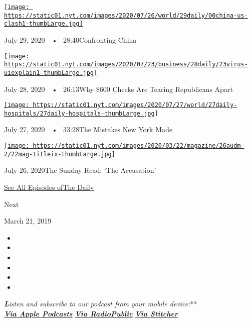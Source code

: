\href{https://www.nytimes.com/2020/07/29/podcasts/the-daily/china-trump-foreign-policy.html?action=click\&module=audio-series-bar\&region=header\&pgtype=Article}{\texttt{[image: https://static01.nyt.com/images/2020/07/26/world/29daily/00china-us-clash1-thumbLarge.jpg]}}

July 29, 2020~~•~ 28:40Confronting China

\href{https://www.nytimes.com/2020/07/28/podcasts/the-daily/unemployment-benefits-coronavirus.html?action=click\&module=audio-series-bar\&region=header\&pgtype=Article}{\texttt{[image: https://static01.nyt.com/images/2020/07/23/business/28daily/23virus-uiexplain1-thumbLarge.jpg]}}

July 28, 2020~~•~ 26:13Why \$600 Checks Are Tearing Republicans Apart

\href{https://www.nytimes.com/2020/07/27/podcasts/the-daily/new-york-hospitals-covid.html?action=click\&module=audio-series-bar\&region=header\&pgtype=Article}{\texttt{[image: https://static01.nyt.com/images/2020/07/27/world/27daily-hospitals/27daily-hospitals-thumbLarge.jpg]}}

July 27, 2020~~•~ 33:28The Mistakes New York Made

\href{https://www.nytimes.com/2020/07/26/podcasts/the-daily/the-accusation-the-sunday-read.html?action=click\&module=audio-series-bar\&region=header\&pgtype=Article}{\texttt{[image: https://static01.nyt.com/images/2020/03/22/magazine/26audm-2/22mag-titleix-thumbLarge.jpg]}}

July 26, 2020The Sunday Read: `The Accusation'

\href{https://www.nytimes.com/column/the-daily}{See All Episodes ofThe
Daily}

Next

March 21, 2019

\begin{itemize}
\item
\item
\item
\item
\item
\item
\end{itemize}

\emph{\textbf{L}isten and subscribe to our podcast from your mobile
device:}**\\
\textbf{\href{https://itunes.apple.com/us/podcast/the-daily/id1200361736?mt=2}{\emph{Via
Apple Podcasts}}} \emph{\textbf{\textbar{}}}
\textbf{\href{https://play.radiopublic.com/88f7d8c3-7289-4dc6-b300-5ba71b43f5e5}{\emph{Via
RadioPublic}}} \emph{\textbf{\textbar{}}}
\textbf{\href{http://www.stitcher.com/podcast/the-new-york-times/the-daily-10}{\emph{Via
Stitcher}}}


